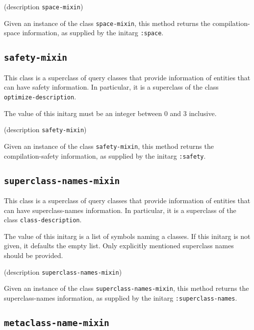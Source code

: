  {(description {\tt space-mixin})}

Given an instance of the class \texttt{space-mixin}, this method
returns the compilation-space information, as supplied by the initarg
\texttt{:space}.

\subsection{\texttt{safety-mixin}}
\label{sec-safety-mixin}

This class is a superclass of query classes that provide information
of entities that can have safety information.  In particular, it is a
superclass of the class \texttt{optimize-description}.


The value of this initarg must be an integer between $0$ and $3$
inclusive.

 {(description {\tt safety-mixin})}

Given an instance of the class \texttt{safety-mixin}, this method
returns the compilation-safety information, as supplied by the initarg
\texttt{:safety}.

\subsection{\texttt{superclass-names-mixin}}
\label{sec-superclass-names-mixin}

This class is a superclass of query classes that provide information
of entities that can have superclass-names information.  In
particular, it is a superclass of the class \texttt{class-description}.


The value of this initarg is a list of symbols naming a classes.  If
this initarg is not given, it defaults the empty list.  Only
explicitly mentioned superclass names should be provided.

 {(description {\tt superclass-names-mixin})}

Given an instance of the class \texttt{superclass-names-mixin}, this
method returns the superclass-names information, as supplied by the
initarg \texttt{:superclass-names}.

\subsection{\texttt{metaclass-name-mixin}}
\label{sec-metaclass-name-mixin}

